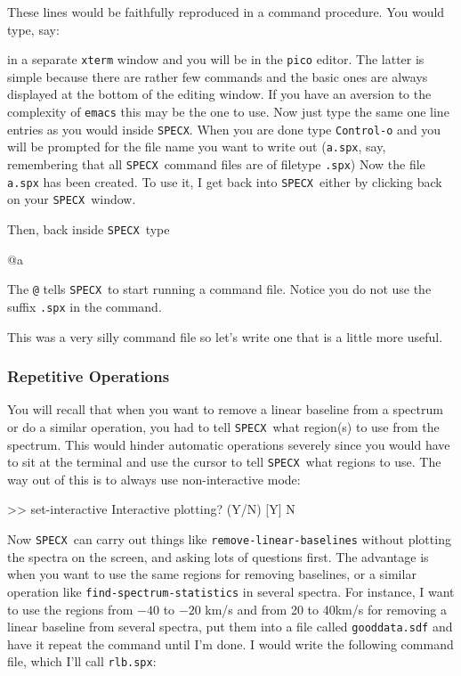 \documentclass[11pt,twoside]{starlink}
\providecommand{\SPECX}{\texttt{SPECX}}
\begin{document}
These lines would be faithfully reproduced in a command procedure.
You would type, say:

in a separate \texttt{xterm} window and you will be in the \texttt{pico}
editor. The latter is simple because there are rather few commands and
the basic ones are always displayed at the bottom of the editing
window. If you have an aversion to the complexity of \texttt{emacs} this
may be the one to use. Now just type the same one line entries as you
would inside \SPECX . When you are done type \texttt{Control-o} and you
will be prompted for the file name you want to write out ({\tt{a.spx}},
say, remembering that all \SPECX\ command files are of filetype \texttt{.spx}) Now the file \texttt{a.spx} has been created.  To use it, I get
back into \SPECX\ either by clicking back on your \SPECX\ window.

Then, back inside \SPECX\ type

\begin{terminalv}
@a
\end{terminalv}

The \texttt{@} tells \SPECX\ to start running a command file.  Notice you
do not use the suffix \texttt{.spx} in the command.

This was a very silly command file so let's write one that is a little
more useful.


\subsubsection{Repetitive Operations}
\label{sec:specx_9.2}

You will recall that when you want to remove a linear baseline from a
spectrum or do a similar operation, you had to tell \SPECX\ what
region(s) to use from the spectrum.  This would hinder automatic
operations severely since you would have to sit at the terminal and
use the cursor to tell \SPECX\ what regions to use.  The way out of
this is to always use non-interactive mode:

\begin{terminalv}
>> set-interactive
Interactive plotting? (Y/N) [Y] N
\end{terminalv}

Now \SPECX\ can carry out things like \texttt{remove-linear-baselines}
without plotting the spectra on the screen, and asking lots of
questions first.  The advantage is when you want to use the same
regions for removing baselines, or a similar operation like \texttt{find-spectrum-statistics} in several spectra.  For instance, I want to
use the regions from $-40$ to $-20$ km/s and from 20 to 40km/s for
removing a linear baseline from several spectra, put them into a file
called \texttt{gooddata.sdf} and have it repeat the command until I'm
done.  I would write the following command file, which I'll call \texttt{rlb.spx}:
\end{document}
